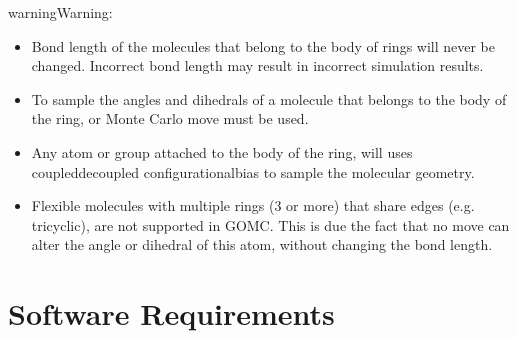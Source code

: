 \documentclass[letterpaper,10pt,english]{sphinxmanual}
\begin{document}
\begin{sphinxadmonition}{warning}{Warning:}\begin{itemize}
\item {} 
\sphinxAtStartPar
Bond length of the  molecules that belong to the body of rings will never be changed. Incorrect bond length may result in incorrect simulation results.

\item {} 
\sphinxAtStartPar
To sample the angles and dihedrals of a  molecule that belongs to the body of the ring,  or  Monte Carlo move must be used.

\item {} 
\sphinxAtStartPar
Any atom or group attached to the body of the ring, will uses coupled\sphinxhyphen{}decoupled configurational\sphinxhyphen{}bias to sample the molecular geometry.

\item {} 
\sphinxAtStartPar
Flexible  molecules with multiple rings (3 or more) that share edges (e.g. tricyclic), are not supported in GOMC. This is due the fact that no  move can alter the angle or dihedral of this atom, without changing the bond length.

\end{itemize}
\end{sphinxadmonition}


\chapter{Software Requirements}
\label{\detokenize{software_requirements:software-requirements}}\label{\detokenize{software_requirements::doc}}
\end{document}
